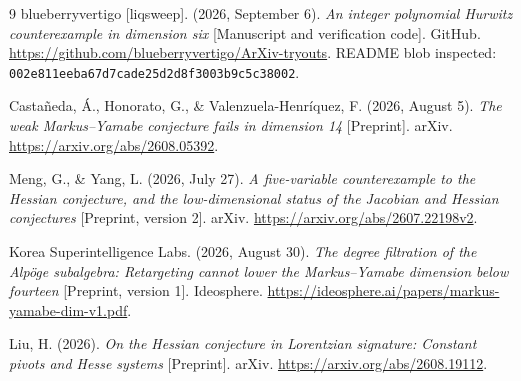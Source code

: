 \documentclass[11pt,a4paper]{article}
\theoremstyle{remark}\newtheorem{remark}[theorem]{Remark}
\begin{document}
\begin{thebibliography}{9}
 blueberryvertigo [liqsweep]. (2026, September 6).
\emph{An integer polynomial Hurwitz counterexample in dimension six}
[Manuscript and verification code]. GitHub.
\url{https://github.com/blueberryvertigo/ArXiv-tryouts}.
README blob inspected: \texttt{002e811eeba67d7cade25d2d8f3003b9c5c38002}.

 Casta\~neda, \'A., Honorato, G., \& Valenzuela-Henr\'iquez, F.
(2026, August 5). \emph{The weak Markus--Yamabe conjecture fails in dimension 14}
[Preprint]. arXiv. \url{https://arxiv.org/abs/2608.05392}.

 Meng, G., \& Yang, L. (2026, July 27).
\emph{A five-variable counterexample to the Hessian conjecture, and the
low-dimensional status of the Jacobian and Hessian conjectures}
[Preprint, version 2]. arXiv. \url{https://arxiv.org/abs/2607.22198v2}.

 Korea Superintelligence Labs. (2026, August 30).
\emph{The degree filtration of the Alp\"oge subalgebra: Retargeting cannot
lower the Markus--Yamabe dimension below fourteen} [Preprint, version 1].
Ideosphere. \url{https://ideosphere.ai/papers/markus-yamabe-dim-v1.pdf}.

 Liu, H. (2026). \emph{On the Hessian conjecture in Lorentzian
signature: Constant pivots and Hesse systems} [Preprint]. arXiv.
\url{https://arxiv.org/abs/2608.19112}.
\end{thebibliography}
\end{document}
